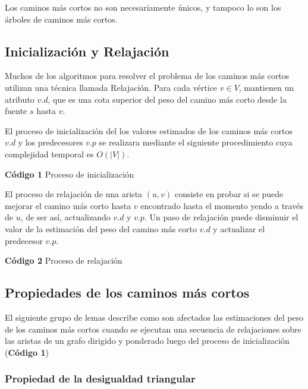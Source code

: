 \documentclass[12pt]{article}
\newcommand{\nl}{\vspace{0.3cm}}
\begin{document}
Los caminos más cortos no son necesariamente únicos, y tampoco lo son los árboles de caminos más cortos.

\subsection{Inicialización y Relajación}

\nl

Muchos de los algoritmos para resolver el problema de los caminos más cortos utilizan una técnica llamada Relajación. Para cada vértice $v \in V$, mantienen un atributo $v.d$, que es una cota superior del peso del camino más corto desde la fuente $s$ hasta $v$.

\nl

El proceso de inicialización del los valores estimados de los caminos más cortos $v.d$ y los predecesores $v.p$ se realizara mediante el siguiente procedimiento cuya complejidad temporal es $O(|V|)$.

\nl

\textbf{Código 1} Proceso de inicialización



\nl

El proceso de relajación de una arista $(u, v)$ consiste en probar si se puede mejorar el camino más corto hasta $v$ encontrado hasta el momento yendo a través de $u$, de ser así, actualizando $v.d$ y $v.p$. Un paso de relajación puede disminuir el valor de la estimación del peso del camino más corto $v.d$ y actualizar el predecesor $v.p$.

\nl

\textbf{Código 2} Proceso de relajación



\newpage

\subsection{Propiedades de los caminos más cortos}

\nl

El siguiente grupo de lemas describe como son afectados las estimaciones del peso de los caminos más cortos cuando se ejecutan una secuencia de relajaciones sobre las aristas de un grafo dirigido y ponderado luego del proceso de inicialización (\textbf{Código 1})

\subsubsection{Propiedad de la desigualdad triangular}
\end{document}
